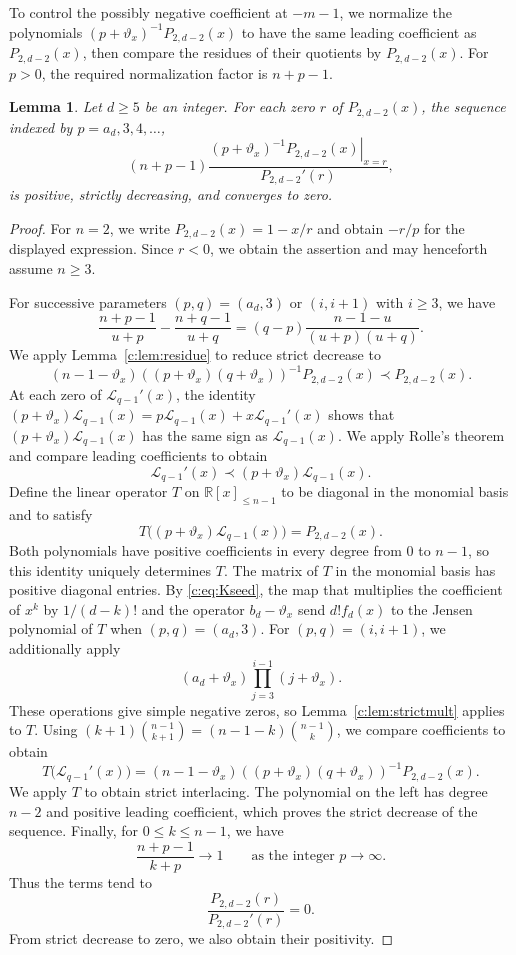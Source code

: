 \documentclass[11pt]{article}
\numberwithin{equation}{section}
\newtheorem{lemma}[theorem]{Lemma}
\theoremstyle{remark}\newtheorem{remark}[theorem]{Remark}
\newcommand{\varthetax}{\vartheta_x}
\begin{document}
To control the possibly negative coefficient at $-m-1$, we normalize
the polynomials $(p+\varthetax)^{-1}P_{2,d-2}(x)$ to have the same
leading coefficient as $P_{2,d-2}(x)$, then compare the residues of their
quotients by $P_{2,d-2}(x)$. For $p>0$, the required normalization factor
is $n+p-1$.

\begin{lemma}\label{c:lem:left}
Let $d\ge5$ be an integer. For each zero $r$ of $P_{2,d-2}(x)$, the sequence indexed by $p=a_d,3,4,\ldots$,
\[
 (n+p-1)\frac{\left.(p+\varthetax)^{-1}P_{2,d-2}(x)\right|_{x=r}}{P_{2,d-2}'(r)},
\]
is positive, strictly decreasing, and converges to zero.
\end{lemma}
\begin{proof}
For $n=2$, we write $P_{2,d-2}(x)=1-x/r$ and obtain $-r/p$ for
the displayed expression. Since $r<0$, we obtain the assertion
and may henceforth assume $n\ge3$.

For successive parameters $(p,q)=(a_d,3)$ or $(i,i+1)$ with $i\ge3$, we have
\[
 \frac{n+p-1}{u+p}-\frac{n+q-1}{u+q}
 =(q-p)\frac{n-1-u}{(u+p)(u+q)}.
\]
We apply Lemma~\ref{c:lem:residue} to reduce strict decrease to
\[
 (n-1-\varthetax)((p+\varthetax)(q+\varthetax))^{-1}P_{2,d-2}(x)
 \prec P_{2,d-2}(x).
\]
At each zero of $\mathscr L_{q-1}'(x)$, the identity
$(p+\varthetax)\mathscr L_{q-1}(x)=p\mathscr L_{q-1}(x)+x\mathscr L_{q-1}'(x)$
shows that $(p+\varthetax)\mathscr L_{q-1}(x)$ has the same sign as
$\mathscr L_{q-1}(x)$. We apply Rolle's theorem and compare leading coefficients
to obtain
\[
 \mathscr L_{q-1}'(x)\prec(p+\varthetax)\mathscr L_{q-1}(x).
\]
Define the linear operator $T$ on $\mathbb R[x]_{\le n-1}$ to be
diagonal in the monomial basis and to satisfy
\[
 T\bigl((p+\varthetax)\mathscr L_{q-1}(x)\bigr)=P_{2,d-2}(x).
\]
Both polynomials have positive coefficients in every degree from $0$
to $n-1$, so this identity uniquely determines $T$. The matrix of $T$
in the monomial basis has positive diagonal entries.
By \eqref{c:eq:Kseed}, the map that multiplies the coefficient of $x^k$
by $1/(d-k)!$ and the operator $b_d-\varthetax$ send $d!f_d(x)$
to the Jensen polynomial of $T$
when $(p,q)=(a_d,3)$. For $(p,q)=(i,i+1)$, we additionally apply
\[
 (a_d+\varthetax)\prod_{j=3}^{i-1}(j+\varthetax).
\]
These operations give simple negative zeros, so
Lemma~\ref{c:lem:strictmult} applies to $T$.
Using $(k+1)\binom{n-1}{k+1}=(n-1-k)\binom{n-1}{k}$,
we compare coefficients to obtain
\[
 T\bigl(\mathscr L_{q-1}'(x)\bigr)
 =(n-1-\varthetax)((p+\varthetax)(q+\varthetax))^{-1}P_{2,d-2}(x).
\]
We apply $T$ to obtain strict interlacing. The polynomial on the left has
degree $n-2$ and positive leading coefficient, which proves the
strict decrease of the sequence.
Finally, for $0\le k\le n-1$, we have
\[
 \frac{n+p-1}{k+p}\to1
 \qquad\text{as the integer }p\to\infty.
\]
Thus the terms tend to
\[
 \frac{P_{2,d-2}(r)}{P_{2,d-2}'(r)}=0.
\]
From strict decrease to zero, we also obtain their positivity.
\end{proof}
\end{document}
